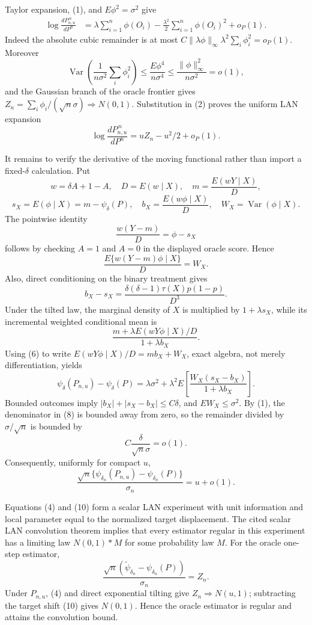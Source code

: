 Taylor expansion, (1), and \(E\phi^2=\sigma^2\) give
\[
\begin{split}
 \log\frac{dP_{n,u}^{\,n}}{dP^n}
 &=\lambda\sum_{i=1}^n\phi(O_i)-\frac{\lambda^2}{2}\sum_{i=1}^n\phi(O_i)^2+o_P(1).
\end{split} \tag{2}
\]
Indeed the absolute cubic remainder is at most \(C\|\lambda\phi\|_\infty\lambda^2\sum_i\phi_i^2=o_P(1)\).  Moreover
\[
 \operatorname{Var}\!\left(\frac1{n\sigma^2}\sum_i\phi_i^2\right)
 \leq\frac{E\phi^4}{n\sigma^4}
 \leq\frac{\|\phi\|_\infty^2}{n\sigma^2}=o(1), \tag{3}
\]
and the Gaussian branch of the oracle frontier gives
\(Z_n=\sum_i\phi_i/(\sqrt n\sigma)\Rightarrow N(0,1)\).  Substitution in (2) proves the uniform LAN expansion
\[
 \log\frac{dP_{n,u}^{\,n}}{dP^n}=uZ_n-u^2/2+o_P(1). \tag{4}
\]

It remains to verify the derivative of the moving functional rather than import a fixed-\(\delta\) calculation.  Put
\[
 w=\delta A+1-A,\quad D=E(w\mid X),\quad m=\frac{E(wY\mid X)}D,
\]
\[
 s_X=E(\phi\mid X)=m-\psi_\delta(P),\quad
 b_X=\frac{E(w\phi\mid X)}D,\quad W_X=\operatorname{Var}(\phi\mid X).
\]
The pointwise identity
\[
 \frac{w(Y-m)}D=\phi-s_X \tag{5}
\]
follows by checking \(A=1\) and \(A=0\) in the displayed oracle score.  Hence
\[
 \frac{E\{w(Y-m)\phi\mid X\}}D=W_X. \tag{6}
\]
Also, direct conditioning on the binary treatment gives
\[
 b_X-s_X=\frac{\delta(\delta-1)\tau(X)p(1-p)}{D^3}. \tag{7}
\]
Under the tilted law, the marginal density of \(X\) is multiplied by \(1+\lambda s_X\), while its incremental weighted conditional mean is
\[
 \frac{m+\lambda E(wY\phi\mid X)/D}{1+\lambda b_X}.
\]
Using (6) to write \(E(wY\phi\mid X)/D=mb_X+W_X\), exact algebra, not merely differentiation, yields
\[
 \psi_\delta(P_{n,u})-\psi_\delta(P)
 =\lambda\sigma^2+\lambda^2E\!\left[\frac{W_X(s_X-b_X)}{1+\lambda b_X}\right]. \tag{8}
\]
Bounded outcomes imply \(|b_X|+|s_X-b_X|\leq C\delta\), and \(EW_X\leq\sigma^2\).  By (1), the denominator in (8) is bounded away from zero, so the remainder divided by \(\sigma/\sqrt n\) is bounded by
\[
 C\frac{\delta}{\sqrt n\sigma}=o(1). \tag{9}
\]
Consequently, uniformly for compact \(u\),
\[
 \frac{\sqrt n\{\psi_{\delta_n}(P_{n,u})-\psi_{\delta_n}(P)\}}{\sigma_n}=u+o(1). \tag{10}
\]

Equations (4) and (10) form a scalar LAN experiment with unit information and local parameter equal to the normalized target displacement.  The cited scalar LAN convolution theorem implies that every estimator regular in this experiment has a limiting law \(N(0,1)*M\) for some probability law \(M\).  For the oracle one-step estimator,
\[
 \frac{\sqrt n(\widetilde\psi_{\delta_n}-\psi_{\delta_n}(P))}{\sigma_n}=Z_n.
\]
Under \(P_{n,u}\), (4) and direct exponential tilting give \(Z_n\Rightarrow N(u,1)\); subtracting the target shift (10) gives \(N(0,1)\).  Hence the oracle estimator is regular and attains the convolution bound.

